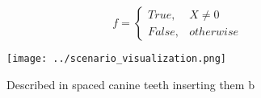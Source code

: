\documentclass[a4paper]{article}
\begin{document}
\begin{equation}   f =
\begin{cases} True, & X \neq 0\\
False, & otherwise
\end{cases}
\end{equation}

\begin{figure}
\centering
\texttt{[image: ../scenario\_visualization.png]}
\caption{Described in spaced canine teeth inserting them b
}
\end{figure}
 
\end{document}
